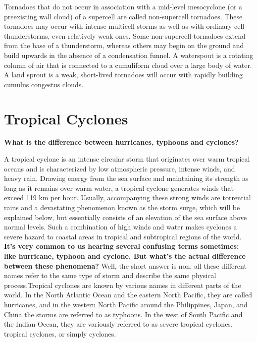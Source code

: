 \documentclass[12pt,oneside]{book}
\begin{document}
Tornadoes that do not occur in association with a mid-level mesocyclone
(or a preexisting wall cloud) of a supercell are called non-supercell
tornadoes. These tornadoes may occur with intense multicell storms as
well as with ordinary cell thunderstorms, even relatively weak ones.
Some non-supercell tornadoes extend from the base of a thunderstorm,
whereas others may begin on the ground and build upwards in the absence
of a condensation funnel. A waterspout is a rotating column of air that
is connected to a cumuliform cloud over a large body of water. A land
sprout is a weak, short-lived tornadoes will occur with rapidly building
cumulus congestus clouds.

\pagebreak

\section{Tropical Cyclones}\label{tropical-cyclones}

\textbf{What is the difference between hurricanes, typhoons and
cyclones?}

A tropical cyclone is an intense circular storm that originates over
warm tropical oceans and is characterized by low atmospheric pressure,
intense winds, and heavy rain. Drawing energy from the sea surface and
maintaining its strength as long as it remains over warm water, a
tropical cyclone generates winds that exceed 119 km per hour. Usually,
accompanying these strong winds are torrential rains and a devastating
phenomenon known as the storm surge, which will be explained below, but
essentially consists of an elevation of the sea surface above normal
levels. Such a combination of high winds and water makes cyclones a
severe hazard to coastal areas in tropical and subtropical regions of
the world. \textbf{It's very common to us hearing several confusing
terms sometimes: like hurricane, typhoon and cyclone. But what's the
actual difference between these phenomena?} Well, the short answer is
non; all these different names refer to the same type of storm and
describe the same physical process.Tropical cyclones are known by
various names in different parts of the world. In the North Atlantic
Ocean and the eastern North Pacific, they are called hurricanes, and in
the western North Pacific around the Philippines, Japan, and China the
storms are referred to as typhoons. In the west of South Pacific and the
Indian Ocean, they are variously referred to as severe tropical
cyclones, tropical cyclones, or simply cyclones.
\end{document}
